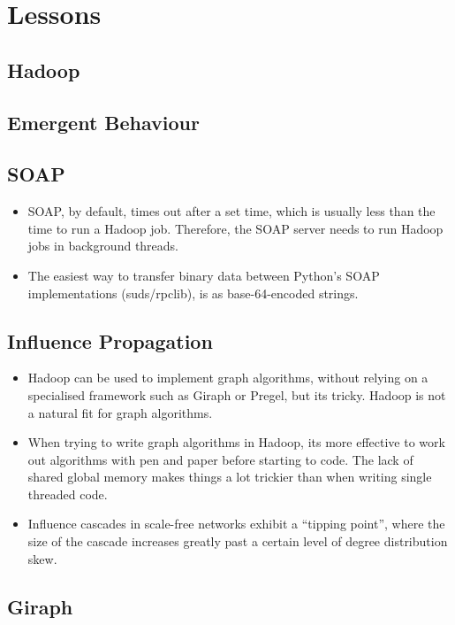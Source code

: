 \section{Lessons}


\subsection{Hadoop}

\subsection{Emergent Behaviour}

\subsection{SOAP}

\begin{itemize}
  \item SOAP, by default, times out after a set time, which is usually less than the time to run a Hadoop job. Therefore, the SOAP server needs to run Hadoop jobs in background threads.
  \item The easiest way to transfer binary data between Python's SOAP implementations (suds/rpclib), is as base-64-encoded strings.
\end{itemize}

\subsection{Influence Propagation}

\begin{itemize}
	\item Hadoop can be used to implement graph algorithms, without relying on a specialised framework such as Giraph or Pregel, but its tricky. Hadoop is not a natural fit for graph algorithms.
	\item When trying to write graph algorithms in Hadoop, its more effective to work out algorithms with pen and paper before starting to code. The lack of shared global memory makes things a lot trickier than when writing single threaded code.
        \item Influence cascades in scale-free networks exhibit a ``tipping point'', where the size of the cascade increases greatly past a certain level of degree distribution skew.
\end{itemize}

\subsection{Giraph}

